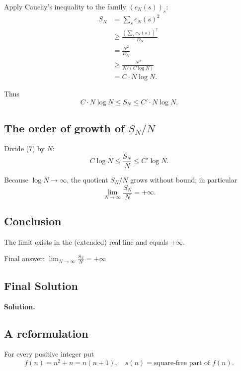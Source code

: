 \documentclass[12pt,a4paper]{article}
\theoremstyle{definition}
\begin{document}
        Apply Cauchy's inequality to the family $(c_N(s))_s$:
        \begin{align}
            S_N &= \sum_s c_N(s)^2 \\
            &\geq \frac{\left(\sum_s c_N(s)\right)^2}{D_N} \\
            &= \frac{N^2}{D_N} \\
            &\geq \frac{N^2}{N/(C \log N)} \\
            &= C \cdot N \log N.
        \end{align}

        Thus
        \begin{equation}
            C \cdot N \log N \leq S_N \leq C' \cdot N \log N.
        \end{equation}

        \subsection*{The order of growth of $S_N / N$}

        Divide (7) by $N$:
        \begin{equation}
            C \log N \leq \frac{S_N}{N} \leq C' \log N.
        \end{equation}

        Because $\log N \to \infty$, the quotient $S_N/N$ grows without bound; in particular
        \begin{equation}
            \lim_{N \to \infty} \frac{S_N}{N} = +\infty.
        \end{equation}

        \subsection*{Conclusion}

        The limit exists in the (extended) real line and equals $+\infty$.

        Final answer: $\displaystyle\boxed{\lim_{N \to \infty} \frac{S_N}{N} = +\infty}$

\subsection{Final Solution}
        \textbf{Solution.}

        \subsection*{A reformulation}
        For every positive integer put
        \[f(n) = n^2 + n = n(n+1), \quad s(n) = \text{square-free part of } f(n).\]
\end{document}
